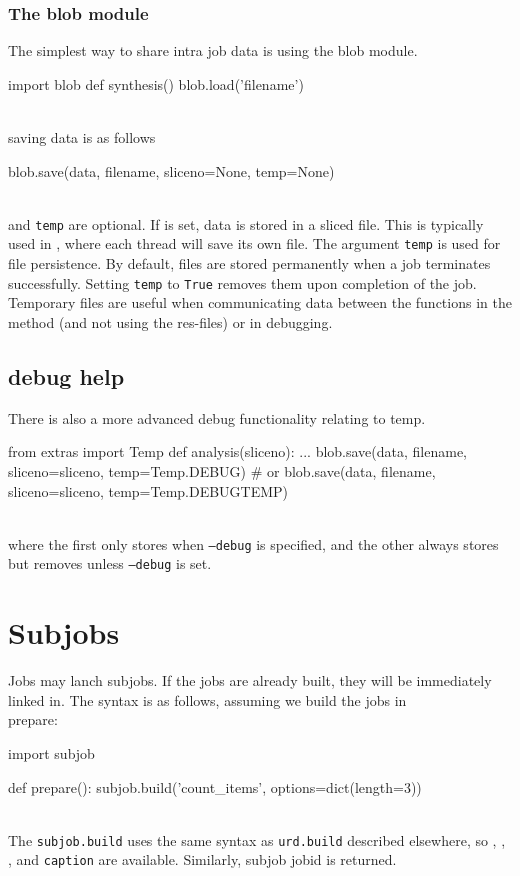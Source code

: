 \subsubsection*{The blob module}
The simplest way to share intra job data is using the blob module.
\\
\begin{python}
import blob
def synthesis()
  blob.load('filename')
\end{python}
\\
saving data is as follows
\\
\begin{python}
  blob.save(data, filename, sliceno=None, temp=None)
\end{python}
\\
\sliceno and \texttt{temp} are optional.  If \sliceno is set, data is
stored in a sliced file.  This is typically used in \analysis, where
each thread will save its own file.  The argument \texttt{temp} is
used for file persistence.  By default, files are stored permanently
when a job terminates successfully.  Setting \texttt{temp} to
\texttt{True} removes them upon completion of the job.  Temporary
files are useful when communicating data between the functions in the
method (and not using the res-files) or in debugging.


\subsection{debug help}
There is also a more advanced debug functionality relating to temp.
\\
\begin{python}
from extras import Temp
def analysis(sliceno):
  ...
  blob.save(data, filename, sliceno=sliceno, temp=Temp.DEBUG)
  # or
  blob.save(data, filename, sliceno=sliceno, temp=Temp.DEBUGTEMP)
\end{python}
\\
where the first only stores when \texttt{--debug} is specified, and
the other always stores but removes unless \texttt{--debug} is set.


\newpage
\section{Subjobs}

Jobs may lanch subjobs.  If the jobs are already built, they will be
immediately linked in.  The syntax is as follows, assuming we build
the jobs in \\prepare:
\\
\begin{python}
import subjob

def prepare():
  subjob.build('count_items', options=dict(length=3))
\end{python}
\\
The \texttt{subjob.build} uses the same syntax as \texttt{urd.build}
described elsewhere, so \options, \datasets, \jobids, and
\texttt{caption} are available.  Similarly, subjob jobid is returned.

